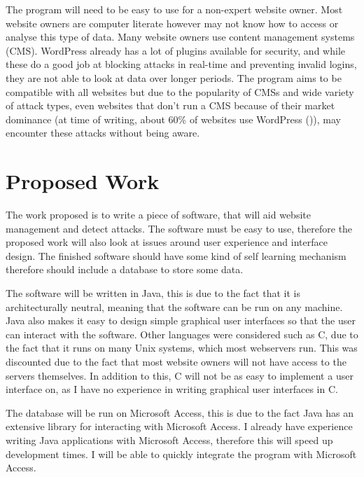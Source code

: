 The program will need to be easy to use for a non-expert website owner. Most website owners are computer literate however may not know how to access or analyse this type of data. Many website owners use content management systems (CMS). WordPress already has a lot of plugins available for security, and while these do a good job at blocking attacks in real-time and preventing invalid logins, they are not able to look at data over longer periods. The program aims to be compatible with all websites but due to the popularity of CMSs and wide variety of attack types, even websites that don't run a CMS  because of their market dominance (at time of writing, about 60\% of websites use WordPress (\cite{IsItWP})), may encounter these attacks without being aware.

\section{Proposed Work}
\label{proposed}
The work proposed is to write a piece of software, that will aid website management and detect attacks. The software must be easy to use, therefore the proposed work will also look at issues around user experience and interface design. The finished software should have some kind of self learning mechanism therefore should include a database to store some data. 

The software will be written in Java, this is due to the fact that it is architecturally neutral, meaning that the software can be run on any machine. Java also makes it easy to design simple graphical user interfaces so that the user can interact with the software. Other languages were considered such as C, due to the fact that it runs on many Unix systems, which most webservers run. This was discounted due to the fact that most website owners will not have access to the servers themselves. In addition to this, C will not be as easy to implement a user interface on, as I have no experience in writing graphical user interfaces in C. 

The database will be run on Microsoft Access, this is due to the fact Java has an extensive library for interacting with Microsoft Access. I already have experience writing Java applications with Microsoft Access, therefore this will speed up development times. I will be able to quickly integrate the program with Microsoft Access. 

